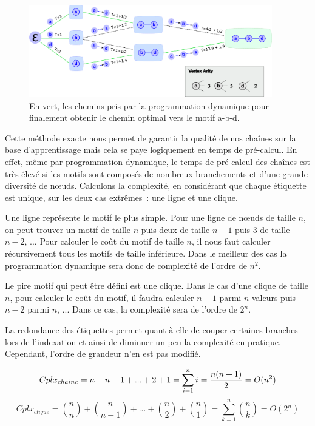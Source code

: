 \begin{figure}[!ht]
  \begin{center}
    \includegraphics[width=400px]{Figures/s2m/indexation/markov.png}
    \caption{\label{markov}En vert, les chemins pris par la programmation dynamique pour finalement obtenir le chemin optimal vers le motif a-b-d.}
  \end{center}
\end{figure}

Cette méthode exacte nous permet de garantir la qualité de nos chaînes sur la base d'apprentissage mais cela se paye logiquement en temps de pré-calcul.
En effet, même par programmation dynamique, le temps de pré-calcul des chaînes est très élevé si les motifs sont composés de nombreux branchements et d'une grande diversité de n\oe{}uds.
Calculons la complexité, en considérant que chaque étiquette est unique, sur les deux cas extrêmes~: une ligne et une clique.

Une ligne représente le motif le plus simple.
Pour une ligne de n\oe{}uds de taille $n$, on peut trouver un motif de taille $n$ puis deux de taille $n-1$ puis 3 de taille $n-2$, ...
Pour calculer le coût du motif de taille $n$, il nous faut calculer récursivement tous les motifs de taille inférieure.
Dans le meilleur des cas la programmation dynamique sera donc de complexité de l'ordre de $n^2$.

Le pire motif qui peut être défini est une clique.
Dans le cas d'une clique de taille $n$, pour calculer le coût du motif, il faudra calculer $n-1$ parmi $n$ valeurs puis $n-2$ parmi $n$, ... Dans ce cas, la complexité sera de l'ordre de $2^n$.

La redondance des étiquettes permet quant à elle de couper certaines branches lors de l'indexation et ainsi de diminuer un peu la complexité en pratique.
Cependant, l'ordre de grandeur n'en est pas modifié.

\begin{equation}
 Cplx_{chaine} = n + n-1 + ... + 2 + 1 = \sum_{i=1}^n i = {{n (n+1)} \over 2} = O(n^2)
\end{equation}
\begin{equation}
 Cplx_{clique} = {n \choose n} + {n \choose n-1} + ... + {n \choose 2} + {n \choose 1} = \sum_{k=1}^n {n \choose k} = O(2^n)
\end{equation}


